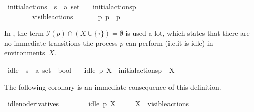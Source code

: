 \begin{isabellebody}
\begin{isamarkuptext}
\end{isamarkuptext}\isamarkuptrue%
\isamarkupfalse%
\ initial{\isacharunderscore}{\kern0pt}actions\ {\isacharcolon}{\kern0pt}{\isacharcolon}{\kern0pt}\ {\isacartoucheopen}{\isacharprime}{\kern0pt}s\ {\isasymRightarrow}\ {\isacharprime}{\kern0pt}a\ set{\isacartoucheclose}\isanewline
\ \ \ {\isacartoucheopen}initial{\isacharunderscore}{\kern0pt}actions{\isacharparenleft}{\kern0pt}p{\isacharparenright}{\kern0pt}\ \isanewline
\ \ \ \ {\isasymequiv}\ {\isacharbraceleft}{\kern0pt}{\isasymalpha}{\isachardot}{\kern0pt}\ {\isacharparenleft}{\kern0pt}{\isasymalpha}\ {\isasymin}\ visible{\isacharunderscore}{\kern0pt}actions\ {\isasymor}\ {\isasymalpha}\ {\isacharequal}{\kern0pt}\ {\isasymtau}{\isacharparenright}{\kern0pt}\ {\isasymand}\ {\isacharparenleft}{\kern0pt}{\isasymexists}\ p{\isacharprime}{\kern0pt}{\isachardot}{\kern0pt}\ p\ {\isasymlongmapsto}{\isasymalpha}\ p{\isacharprime}{\kern0pt}{\isacharparenright}{\kern0pt}{\isacharbraceright}{\kern0pt}{\isacartoucheclose}%
\begin{isamarkuptext}%
In \cite{rbs}, the term $\mathcal{I}(p) \cap (X \cup \{\tau\}) = \emptyset$ is used a lot, which states that there are no immediate transitions the process $p$ can perform (i.e.\@ it is idle) in environments~$X$.%
\end{isamarkuptext}\isamarkuptrue%
\isamarkupfalse%
\ idle\ {\isacharcolon}{\kern0pt}{\isacharcolon}{\kern0pt}\ {\isacartoucheopen}{\isacharprime}{\kern0pt}s\ {\isasymRightarrow}\ {\isacharprime}{\kern0pt}a\ set\ {\isasymRightarrow}\ bool{\isacartoucheclose}\isanewline
\ \ \ {\isacartoucheopen}idle\ p\ X\ {\isasymequiv}\ initial{\isacharunderscore}{\kern0pt}actions{\isacharparenleft}{\kern0pt}p{\isacharparenright}{\kern0pt}\ {\isasyminter}\ {\isacharparenleft}{\kern0pt}X{\isasymunion}{\isacharbraceleft}{\kern0pt}{\isasymtau}{\isacharbraceright}{\kern0pt}{\isacharparenright}{\kern0pt}\ {\isacharequal}{\kern0pt}\ {\isasymemptyset}{\isacartoucheclose}%
\begin{isamarkuptext}%
The following corollary is an immediate consequence of this definition.%
\end{isamarkuptext}\isamarkuptrue%
\isamarkupfalse%
\ idle{\isacharunderscore}{\kern0pt}no{\isacharunderscore}{\kern0pt}derivatives{\isacharcolon}{\kern0pt}\isanewline
\ \ \ \isanewline
\ \ \ \ {\isacartoucheopen}idle\ p\ X{\isacartoucheclose}\ \isanewline
\ \ \ \ {\isacartoucheopen}X\ {\isasymsubseteq}\ visible{\isacharunderscore}{\kern0pt}actions{\isacartoucheclose}\isanewline

\end{isabellebody}
